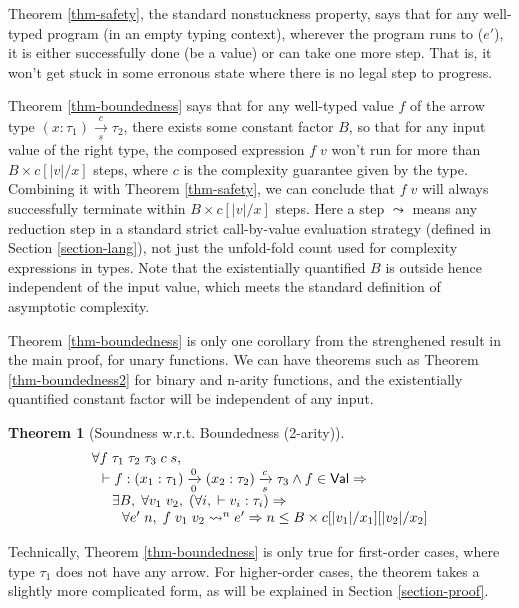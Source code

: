 \documentclass[preprint]{sigplanconf}
\newcommand{\arrow}[4]{#1\xrightarrow[#3]{#2}#4}
\newtheorem{thm}{Theorem}
\begin{document}
Theorem \ref{thm-safety}, the standard nonstuckness property, says that for any well-typed program (in an empty typing context), wherever the program runs to ($e'$), it is either successfully done (be a value) or can take one more step. That is, it won't get stuck in some erronous state where there is no legal step to progress.

Theorem \ref{thm-boundedness} says that for any well-typed value $f$ of the arrow type $\arrow{(x:\tau_1)}{c}{s}{\tau_2}$, there exists some constant factor $B$, so that for any input value of the right type, the composed expression $f\;v$ won't run for more than $B\times c[|v|/x]$ steps, where $c$ is the complexity guarantee given by the type. Combining it with Theorem \ref{thm-safety}, we can conclude that $f\;v$ will always successfully terminate within $B\times c[|v|/x]$ steps. Here a step $\leadsto$ means any reduction step in a standard strict call-by-value evaluation strategy (defined in Section \ref{section-lang}), not just the unfold-fold count used for complexity expressions in types. Note that the existentially quantified $B$ is outside hence independent of the input value, which meets the standard definition of asymptotic complexity. 

Theorem \ref{thm-boundedness} is only one corollary from the strenghened result in the main proof, for unary functions. We can have theorems such as Theorem \ref{thm-boundedness2} for binary and n-arity functions, and the existentially quantified constant factor will be independent of any input.

\begin{thm}[\label{thm-boundedness2}Soundness w.r.t. Boundedness (2-arity)]
$$
\begin{array}{l}
\forall f\;\tau_1\;\tau_2\;\tau_3\;c\;s, \\
\hspace{0.1in} \vdash f:\arrow{(x_1:\tau_1)}{0}{0}{\arrow{(x_2:\tau_2)}{c}{s}{\tau_3}} \wedge f\in\mathsf{Val}\Rightarrow \\
\hspace{0.2in} \exists B, \;\forall v_1\;v_2,\; (\forall i,\;\vdash v_i:\tau_i) \Rightarrow \\
\hspace{0.3in} \forall e'\;n,\; f\;v_1\;v_2\leadsto^n e' \Rightarrow n\leq B\times c[|v_1|/x_1][|v_2|/x_2]
\end{array}
$$
\end{thm}

Technically, Theorem \ref{thm-boundedness} is only true for first-order cases, where type $\tau_1$ does not have any arrow. For higher-order cases, the theorem takes a slightly more complicated form, as will be explained in Section \ref{section-proof}.
\end{document}
